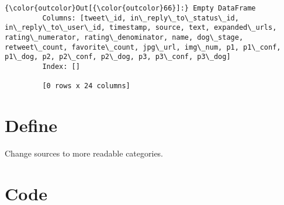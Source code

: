 \documentclass[11pt]{article}
\begin{document}
\begin{Verbatim}[commandchars=\\\{\}]
{\color{outcolor}Out[{\color{outcolor}66}]:} Empty DataFrame
         Columns: [tweet\_id, in\_reply\_to\_status\_id, in\_reply\_to\_user\_id, timestamp, source, text, expanded\_urls, rating\_numerator, rating\_denominator, name, dog\_stage, retweet\_count, favorite\_count, jpg\_url, img\_num, p1, p1\_conf, p1\_dog, p2, p2\_conf, p2\_dog, p3, p3\_conf, p3\_dog]
         Index: []
         
         [0 rows x 24 columns]
\end{Verbatim}
            
    \hypertarget{define}{%
\section{Define}\label{define}}

    Change sources to more readable categories.

    \hypertarget{code}{%
\section{Code}\label{code}}
\end{document}
